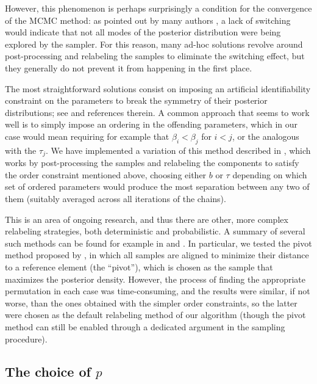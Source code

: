 However, this phenomenon is perhaps surprisingly a condition for the convergence of the MCMC method: as pointed out by many authors \citep[e.g.][]{celeux2000computational}, a lack of switching would indicate that not all modes of the posterior distribution were being explored by the sampler. For this reason, many ad-hoc solutions revolve around post-processing and relabeling the samples to eliminate the switching effect, but they generally do not prevent it from happening in the first place.

The most straightforward solutions consist on imposing an artificial identifiability constraint on the parameters to break the symmetry of their posterior distributions; see \citet{jasra2005markov} and references therein. A common approach that seems to work well is to simply impose an ordering in the offending parameters, which in our case would mean requiring for example that \(\beta_i < \beta_j\) for \(i < j\), or the analogous with the \(\tau_j\). We have implemented a variation of this method described in \citet{simola2021approximate}, which works by post-processing the samples and relabeling the components to satisfy the order constraint mentioned above, choosing either \(b\) or \(\tau\) depending on which set of ordered parameters would produce the most separation between any two of them (suitably averaged across all iterations of the chains).

This is an area of ongoing research, and thus there are other, more complex relabeling strategies, both deterministic and probabilistic. A summary of several such methods can be found for example in \citet{rodriguez2014label} and \citet{papastamoulis2015label}. In particular, we tested the pivot method proposed by \citet{marin2005bayesian}, in which all samples are aligned to minimize their distance to a reference element (the ``pivot''), which is chosen as the sample that maximizes the posterior density. However, the process of finding the appropriate permutation in each case was time-consuming, and the results were similar, if not worse, than the ones obtained with the simpler order constraints, so the latter were chosen as the default relabeling method of our algorithm (though the pivot method can still be enabled through a dedicated argument in the sampling procedure).

\subsection*{The choice of \(p\)}

